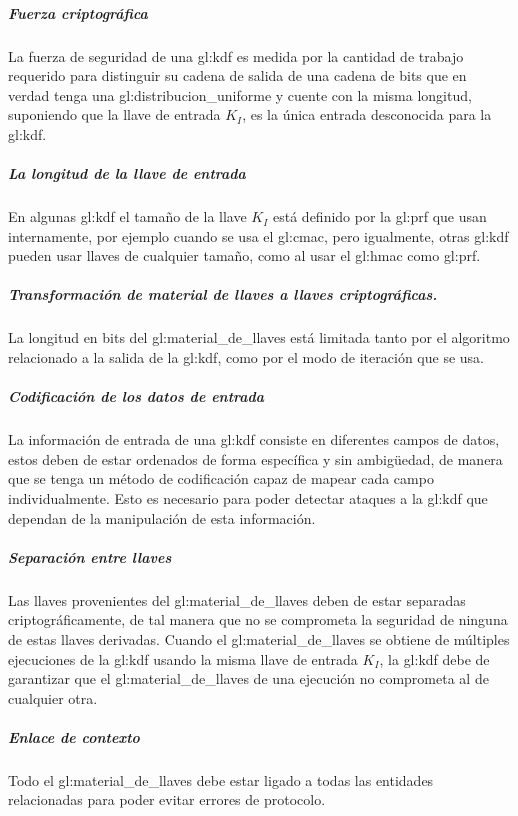 \subparagraph{Fuerza criptográfica}
La fuerza de seguridad de una \gls{gl:kdf} es medida por la cantidad de 
trabajo requerido para distinguir su cadena de salida de una cadena de bits 
que en verdad tenga una \gls{gl:distribucion_uniforme} y cuente con la misma 
longitud, suponiendo que la llave de entrada $K_I$, es la única entrada 
desconocida para la \gls{gl:kdf}.

\subparagraph{La longitud de la llave de entrada}
En algunas \gls{gl:kdf} el tamaño de la llave $K_I$ está definido por la 
\gls{gl:prf} que usan internamente, por ejemplo cuando se usa el \gls{gl:cmac}, 
pero igualmente, otras \gls{gl:kdf} pueden usar llaves de cualquier tamaño, 
como al usar el \gls{gl:hmac} como \gls{gl:prf}.

\subparagraph{Transformación de material de llaves a llaves criptográficas.}
La longitud en bits del \gls{gl:material_de_llaves} está limitada tanto por 
el algoritmo relacionado a la salida de la \gls{gl:kdf}, como por el modo de 
iteración que se usa.

\subparagraph{Codificación de los datos de entrada}
La información de entrada de una \gls{gl:kdf} consiste en diferentes campos 
de datos, estos deben de estar ordenados de forma específica y sin ambigüedad, 
de manera que se tenga un método de codificación capaz de mapear cada campo 
individualmente. Esto es necesario para poder detectar ataques a la 
\gls{gl:kdf} que dependan de la manipulación de esta información.

\subparagraph{Separación entre llaves}
Las llaves provenientes del \gls{gl:material_de_llaves} deben de estar 
separadas criptográficamente, de tal manera que no se comprometa la seguridad 
de ninguna de estas llaves derivadas. Cuando el \gls{gl:material_de_llaves} 
se obtiene de múltiples ejecuciones de la \gls{gl:kdf} usando la misma llave 
de entrada $K_I$, la \gls{gl:kdf} debe de garantizar que el 
\gls{gl:material_de_llaves} de una ejecución no comprometa al de cualquier 
otra.

\subparagraph{Enlace de contexto}
Todo el \gls{gl:material_de_llaves} debe estar ligado a todas las entidades 
relacionadas para poder evitar errores de protocolo.

